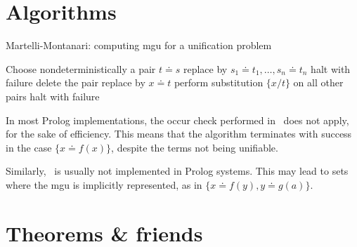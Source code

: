 \section{Algorithms}
\begin{algorithm}[!h]
    \caption{Martelli-Montanari: computing \gls{mgu} for a unification problem \label{alg:mm}}
    \begin{algorithmic}[1]
      \Statex
      \Repeat
      \State Choose nondeterministically a pair \(t \doteq s\)
      \State replace by \(s_1 \doteq t_1,\dotsc,s_n \doteq t_n\) \label{mm:1}
      \EndCase
      \State halt with failure  \label{mm:2}
      \EndCase
      \State delete the pair \label{mm:3}
      \EndCase
      \State replace by \(x \doteq t\) \label{mm:4}
      \EndCase
      \State perform substitution \(\lbrace x/t \rbrace\) on all other pairs \label{mm:5}
      \EndCase
      \State halt with failure  \label{mm:6}
      \EndCase
      \EndSwitch
      \State {}
    \end{algorithmic}
  \end{algorithm}

  \begin{rem}
      In most Prolog implementations, the occur check performed in~ does not apply, for the sake of efficiency.
      This means that the algorithm terminates with success in the case \(\lbrace x \doteq f(x) \rbrace\), despite the terms not being unifiable.

      Similarly,~ is usually not implemented in Prolog systems.
      This may lead to sets where the \gls{mgu} is implicitly represented, as in \(\lbrace x \doteq f(y), y \doteq g(a) \rbrace\).
  \end{rem}

\section{Theorems \& friends}

